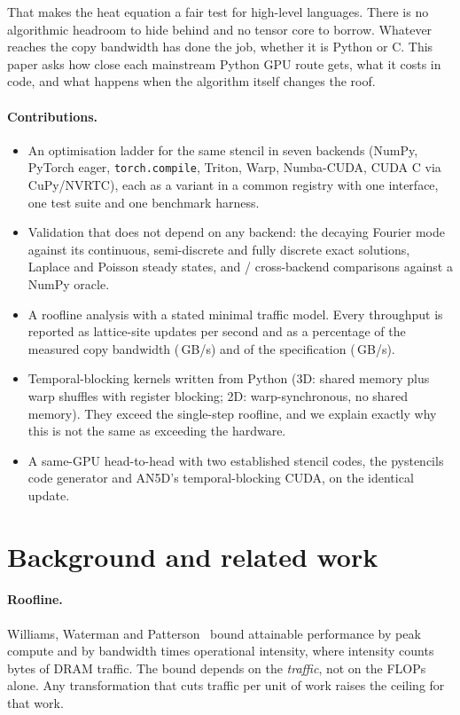 \documentclass[11pt]{article}
\newcommand{\code}[1]{\texttt{#1}}
\begin{document}
That makes the heat equation a fair test for high-level languages. There is no algorithmic
headroom to hide behind and no tensor core to borrow. Whatever reaches the copy bandwidth has
done the job, whether it is Python or C. This paper asks how close each mainstream Python GPU
route gets, what it costs in code, and what happens when the algorithm itself changes the
roof.

\paragraph{Contributions.}
\begin{itemize}
\item An optimisation ladder for the same stencil in seven backends (NumPy, PyTorch eager,
  \code{torch.compile}, Triton, Warp, Numba-CUDA, CUDA C via CuPy/NVRTC), each as a variant in a
  common registry with one interface, one test suite and one benchmark harness.
\item Validation that does not depend on any backend: the decaying Fourier mode against its
  continuous, semi-discrete and fully discrete exact solutions, Laplace and Poisson steady
  states, and \nCrossPass/\nCross{} cross-backend comparisons against a NumPy oracle.
\item A roofline analysis with a stated minimal traffic model. Every throughput is reported as
  lattice-site updates per second and as a percentage of the measured copy bandwidth
  (\copyBW\,GB/s) and of the specification (\specBW\,GB/s).
\item Temporal-blocking kernels written from Python (3D: shared memory plus warp shuffles with
  register blocking; 2D: warp-synchronous, no shared memory). They exceed the single-step
  roofline, and we explain exactly why this is not the same as exceeding the hardware.
\item A same-GPU head-to-head with two established stencil codes, the pystencils code
  generator and AN5D's temporal-blocking CUDA, on the identical update.
\end{itemize}

\section{Background and related work}
\paragraph{Roofline.}
Williams, Waterman and Patterson~\cite{williams2009roofline} bound attainable performance by
peak compute and by bandwidth times operational intensity, where intensity counts bytes of
DRAM traffic. The bound depends on the \emph{traffic}, not on the FLOPs alone. Any
transformation that cuts traffic per unit of work raises the ceiling for that work.
\end{document}
